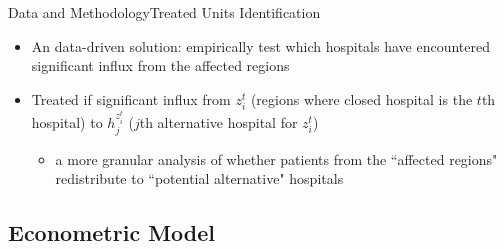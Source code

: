\documentclass{beamer}
\theoremstyle{definition}
\begin{document}
\begin{frame}{Data and Methodology}{Treated Units Identification}



\vspace{-0.55cm}

\begin{itemize}
    \item An data-driven solution: empirically test which hospitals have encountered significant influx from the affected regions %
    \item Treated if significant influx from $z^t_i$ (regions where closed hospital is the $t$th hospital) to $h^{z^t_i}_j$ ($j$th alternative hospital for $z^t_i$)
    \begin{itemize}
        \item a more granular analysis of whether patients from the ``affected regions" redistribute to ``potential alternative" hospitals %
    \end{itemize}
\end{itemize}
\end{frame}




\subsection{Econometric Model}

\end{document}
